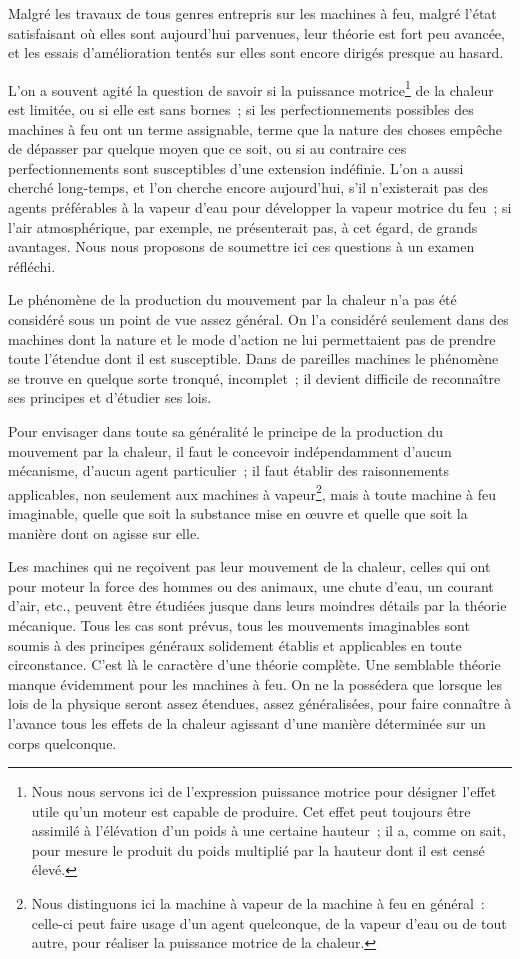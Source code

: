 \documentclass[french,twoside]{book} %
\begin{document}
Malgré les travaux de tous genres entrepris sur les machines à feu, malgré l’état satisfaisant où elles sont aujourd’hui parvenues, leur théorie est fort peu avancée, et les essais d’amélioration tentés sur elles sont encore dirigés presque au hasard.\par
L’on a souvent agité la question de savoir si la puissance motrice\footnote{Nous nous servons ici de l’expression puissance motrice pour désigner l’effet utile qu’un moteur est capable de produire. Cet effet peut toujours être assimilé à l’élévation d’un poids à une certaine hauteur ; il a, comme on sait, pour mesure le produit du poids multiplié par la hauteur dont il est censé élevé.} de la chaleur est limitée, ou si elle est sans bornes ; si les perfectionnements possibles des machines à feu ont un terme assignable, terme que la nature des choses empêche de dépasser par quelque moyen que ce soit, ou si au contraire ces perfectionnements sont susceptibles d’une extension indéfinie. L’on a aussi cherché long-temps, et l’on cherche encore aujourd’hui, s’il n’existerait pas des agents préférables à la vapeur d’eau pour développer la vapeur motrice du feu ; si l’air atmosphérique, par exemple, ne présenterait pas, à cet égard, de grands avantages. Nous nous proposons de soumettre ici ces questions à un examen réfléchi.\par
Le phénomène de la production du mouvement par la chaleur n’a pas été considéré sous un point de vue assez général. On l’a considéré seulement dans des machines dont la nature et le mode d’action ne lui permettaient pas de prendre toute l’étendue dont il est susceptible. Dans de pareilles machines le phénomène se trouve en quelque sorte tronqué, incomplet ; il devient difficile de reconnaître ses principes et d’étudier ses lois.\par
Pour envisager dans toute sa généralité le principe de la production du mouvement par la chaleur, il faut le concevoir indépendamment d’aucun mécanisme, d’aucun agent particulier ; il faut établir des raisonnements applicables, non seulement aux machines à vapeur\footnote{Nous distinguons ici la machine à vapeur de la machine à feu en général : celle-ci peut faire usage d’un agent quelconque, de la vapeur d’eau ou de tout autre, pour réaliser la puissance motrice de la chaleur.}, mais à toute machine à feu imaginable, quelle que soit la substance mise en œuvre et quelle que soit la manière dont on agisse sur elle.\par
Les machines qui ne reçoivent pas leur mouvement de la chaleur, celles qui ont pour moteur la force des hommes ou des animaux, une chute d’eau, un courant d’air, etc., peuvent être étudiées jusque dans leurs moindres détails par la théorie mécanique. Tous les cas sont prévus, tous les mouvements imaginables sont soumis à des principes généraux solidement établis et applicables en toute circonstance. C’est là le caractère d’une théorie complète. Une semblable théorie manque évidemment pour les machines à feu. On ne la possédera que lorsque les lois de la physique seront assez étendues, assez généralisées, pour faire connaître à l’avance tous les effets de la chaleur agissant d’une manière déterminée sur un corps quelconque.\par
\end{document}

